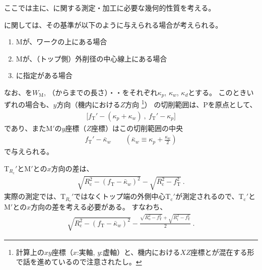 

ここでは主に、\textbf{\Keyway}に関する測定・加工に必要な幾何的性質を考える。



\textbf{\Keyway}に関しては、その基準が以下のように与えられる場合が考えられる。
\begin{enumerate}[label=\sarrow]
\item \KeywayCenter Mが、ワークの\CenterCurvatureLine 上にある場合
\item \KeywayCenter Mが、（トップ側）外削径の中心線上にある場合
\item \AsideKeywayDepth に指定がある場合
\end{enumerate}
なお、\KeywayDiameter を$W_\mathrm M$, \KeywayPos（\EndFace から\Keyway までの長さ）・\KeywayWidth・\AsideKeywayDepth をそれぞれ$\kappa_p$, $\kappa_w$, $\kappa_d$とする。
このときいずれの場合も、$y$方向（機内における$Z$方向
\footnote{計算上の$xy$座標（$x$:実軸, $y$:虚軸）と、機内における$XZ$座標とが混在する形で話を進めているので注意されたし。}）
の切削範囲は、\TableCenter Pを原点として、
\begin{align*}
  \big[f_\mathrm T'-(\kappa_p+\kappa_w)\ ,\ f_\mathrm T'-\kappa_p\big]
\end{align*}
であり、また\KeywayCenter M$'$の$y$座標（$Z$座標）はこの切削範囲の中央
\begin{align}
  \label{eq:mizocenterZ}
  f_\mathrm T'-\bar\kappa_w \qquad
  \left(\bar\kappa_w \equiv \kappa_p+\frac{\kappa_w}2\right)
\end{align}
で与えられる。



\clearpage
\TopCurvatureCenter T$_{R_\mathrm c}'$と\KeywayCenter M$'$との$x$方向の差は、
\begin{align*}
  \sqrt{R_\mathrm c^2-\left(f_\mathrm T-\bar\kappa_w\right)^2}
  -\sqrt{R_\mathrm c^2-f_\mathrm T^2}\ .
\end{align*}
実際の測定では、\TopCurvatureCenter T$_{R_\mathrm c}'$ではなくトップ端の外側中心T$_\mathrm c'$が測定されるので、T$_\mathrm c'$とM$'$との$x$方向の差を考える必要がある。
すなわち、
\begin{align}
  \label{eq:difTopMizoCenter}
  \sqrt{R_\mathrm c^2-\left(f_\mathrm T-\bar\kappa_w\right)^2}
  -\frac{\sqrt{R_\mathrm o^2-f_\mathrm T^2}+\sqrt{R_\mathrm i^2-f_\mathrm T^2}}2\ .
\end{align}



